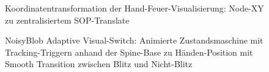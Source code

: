 \begin{figure}[htbp]
    \centering
    \caption{Koordinatentransformation der Hand-Feuer-Visualisierung: Node-XY zu zentralisiertem SOP-Translate}
    \label{fig:coordinate_transformation}
\end{figure}

\begin{figure}[htbp]
    \centering
    \caption{NoisyBlob Adaptive Visual-Switch: Animierte Zustandsmaschine mit Tracking-Triggern anhand der Spine-Base zu Händen-Position mit Smooth Transition zwischen Blitz und Nicht-Blitz}
    \label{fig:animated_switch}
\end{figure}

